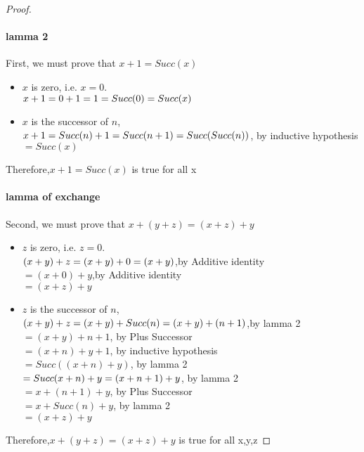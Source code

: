 \documentclass[11pt,a4paper]{article}
\begin{document}
\begin{proof}
   \paragraph{lamma 2}First, we must prove that $x + 1 = Succ(x)$\\
   \begin{itemize}
        \item $x$ is zero, i.e. $x = 0$.\\
        $
        x + 1\\
        = 0 + 1\\
        = 1\\
        = Succ(0)\\
        = Succ(x)
        $
        \item $x$ is the successor of $n$,\\
        $
        x + 1\\
        = Succ(n) + 1\\
        = Succ(n + 1)\\
        = Succ(Succ(n))$, by inductive hypothesis\\
        $= Succ(x)$\\
    \end{itemize}
    Therefore,$x + 1 = Succ(x)$ is true for all x
    \paragraph{lamma of exchange}Second, we must prove that $x + (y + z) = (x + z) + y$\\
       \begin{itemize}
        \item $z$ is zero, i.e. $z = 0$.\\
        $
        (x + y) + z \\
        = (x + y) + 0
        = (x + y)$,by Additive identity\\
        $= (x + 0) + y$,by Additive identity\\
        $= (x + z) + y$
        \item $z$ is the successor of $n$,\\
        $
        (x + y) + z \\
        = (x + y) + Succ(n)\\
        = (x + y) + (n + 1)$,by lamma 2\\
        $= (x + y) + n + 1$, by Plus Successor\\
        $= (x + n) + y + 1$, by inductive hypothesis\\
        $= Succ((x + n) + y)$, by lamma 2\\
        $= Succ(x + n) + y\\
        = (x + n + 1) + y$, by lamma 2\\
        $= x + (n + 1) + y$, by Plus Successor\\
        $= x + Succ(n) + y$, by lamma 2\\
        $= (x + z) + y$
    \end{itemize}
    Therefore,$x + (y + z) = (x + z) + y$ is true for all x,y,z

\end{proof}
\end{document}

